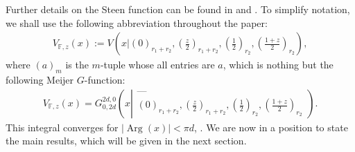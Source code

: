 \documentclass[12pt,reqno]{amsart}
\newcommand{\Arg}{\operatorname{Arg}}
\renewcommand{\(}{\left\(}
\renewcommand{\)}{\right\)}
\renewcommand{\[}{\left\[}
\renewcommand{\]}{\right\]}
\numberwithin{equation}{section}
\theoremstyle{plain}
\begin{document}
Further details on the Steen function can be found in \cite[p.~63]{KT} and \cite{Steen}.
To simplify notation, we shall use the following abbreviation throughout the paper:
\begin{align}\label{Short notation}
V_{\mathbb{F},z}(x) := V\left(x\bigg|\left(0\right)_{r_1 + r_2}, \left(\frac{z}{2}\right)_{r_1 + r_2}, \left(\frac{1}{2}\right)_{r_2}, \left(\frac{1+z}{2}\right)_{r_2}\right),
\end{align}
where $(a)_m$ is the $m$-tuple whose all entries are $a$, which is nothing but the following Meijer $G$-function:
\begin{align*}
V_{\mathbb{F},z}(x) = G^{2d, 0}_{0, 2d}\left(x \left| \begin{matrix} \text{---} \\ \left(0\right)_{r_1 + r_2}, \left(\frac{z}{2}\right)_{r_1 + r_2}, \left(\frac{1}{2}\right)_{r_2}, \left(\frac{1+z}{2}\right)_{r_2} \end{matrix} \right.\right).
\end{align*} 
This integral converges for $|\Arg(x)| < \pi d$, \cite[p.~415, Def.~16.17, Prop.~1]{OLBC2010}. We are now in a position to state the main results, which will be given in the next section. 
\end{document}
